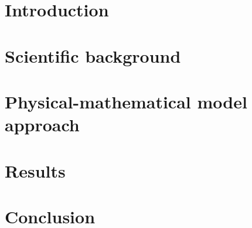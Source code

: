 \documentclass[
oneside,
a4paper,
12pt,
titlepage]
{article}
\begin{document}

\newpage

\newpage

\newpage
\pagestyle{standard}
\setcounter{table}{0} %
\renewcommand{\thetable}{\arabic{table}} %

\section{Introduction}


\section{Scientific background}



\section{Physical-mathematical model approach}


\section{Results}


\section{Conclusion}


\newpage

\end{document}
